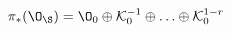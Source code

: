 \begin{equation}\label{ide2}
\pi_*(\O_{\S})=\O_0\oplus\mathcal{K}_0^{-1}\oplus\ldots\oplus\mathcal{K}_0^{1-r}
\end{equation}

